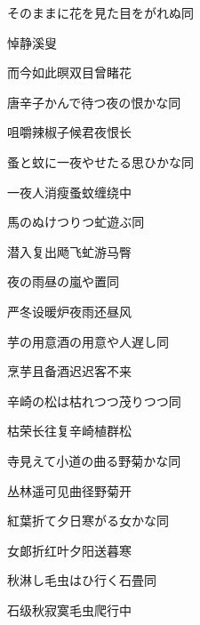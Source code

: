\begin{haiku}
    {\FH そのままに花を見た目をがれぬ}\hfill{\FH 同}

    {\FK 悼静溪叟}

    {\FK 而今如此暝双目曾睹花}
\end{haiku}

\begin{haiku}
    {\FH 唐辛子かんで待つ夜の恨かな}\hfill{\FH 同}

    {\FK 咀嚼辣椒子候君夜恨长}
\end{haiku}

\begin{haiku}
    {\FH 蚤と蚊に一夜やせたる思ひかな}\hfill{\FH 同}

    {\FK 一夜人消瘦蚤蚊缠绕中}
\end{haiku}

\begin{haiku}
    {\FH 馬のぬけつりつ虻遊ぶ}\hfill{\FH 同}

    {\FK 潜入复出飏飞虻游马臀}
\end{haiku}

\begin{haiku}
    {\FH 夜の雨昼の嵐や置}\hfill{\FH 同}

    {\FK 严冬设暖炉夜雨还昼风}
\end{haiku}

\begin{haiku}
    {\FH 芋の用意酒の用意や人遅し}\hfill{\FH 同}

    {\FK 烹芋且备酒迟迟客不来}
\end{haiku}

\begin{haiku}
    {\FH 辛崎の松は枯れつつ茂りつつ}\hfill{\FH 同}

    {\FK 枯荣长往复辛崎植群松}
\end{haiku}

\begin{haiku}
    {\FH 寺見えて小道の曲る野菊かな}\hfill{\FH 同}

    {\FK 丛林遥可见曲径野菊开}
\end{haiku}

\begin{haiku}
    {\FH 紅葉折て夕日寒がる女かな}\hfill{\FH 同}

    {\FK 女郞折红叶夕阳送暮寒}
\end{haiku}

\begin{haiku}
    {\FH 秋淋し毛虫はひ行く石畳}\hfill{\FH 同}

    {\FK 石级秋寂寞毛虫爬行中}
\end{haiku}

